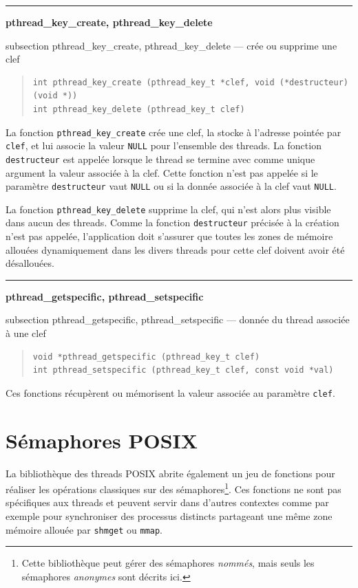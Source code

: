 \documentclass [twoside] {report}
\newcommand {\primitive} [1]
    {
	\phantomsection
	{\large \textbf {#1}}
	\addcontentsline {toc} {subsection} {#1}
    }
\newcommand {\separation}
    {
	\vspace {5mm}
	\nopagebreak
	\hrule
    }
\begin{document}
\separation
\primitive {pthread\_key\_create, pthread\_key\_delete} --- crée ou supprime une clef

\begin {quote}
\begin {verbatim}
int pthread_key_create (pthread_key_t *clef, void (*destructeur) (void *))
int pthread_key_delete (pthread_key_t clef)
\end{verbatim}
\end {quote}

La fonction \verb|pthread_key_create| crée une clef, la stocke à
l'adresse pointée par \texttt {clef}, et lui associe la valeur \texttt
{NULL} pour l'ensemble des threads. La fonction \texttt {destructeur}
est appelée lorsque le thread se termine avec comme unique argument la
valeur associée à la clef. Cette fonction n'est pas appelée si le
paramètre \texttt {destructeur} vaut \texttt {NULL} ou si la donnée
associée à la clef vaut \texttt {NULL}.

La fonction \verb|pthread_key_delete| supprime la clef, qui n'est
alors plus visible dans aucun des threads. Comme la fonction \texttt
{destructeur} précisée à la création n'est pas appelée, l'application
doit s'assurer que toutes les zones de mémoire allouées dynamiquement
dans les divers threads pour cette clef doivent avoir été désallouées.


\separation
\primitive {pthread\_getspecific, pthread\_setspecific} --- donnée du thread associée à une clef

\begin {quote}
\begin {verbatim}
void *pthread_getspecific (pthread_key_t clef)
int pthread_setspecific (pthread_key_t clef, const void *val)
\end{verbatim}
\end {quote}

Ces fonctions récupèrent ou mémorisent la valeur associée au
paramètre \texttt {clef}.


\section {Sémaphores POSIX}

La bibliothèque des threads POSIX abrite également un jeu de fonctions
pour réaliser les opérations classiques sur des sémaphores\footnote
{ Cette bibliothèque peut gérer des sémaphores \textit {nommés},
mais seuls les sémaphores \textit {anonymes} sont décrits ici.}. Ces
fonctions ne sont pas spécifiques aux threads et peuvent servir dans
d'autres contextes comme par exemple pour synchroniser des processus
distincts partageant une même zone mémoire allouée par \texttt {shmget}
ou \texttt {mmap}.
\end{document}

